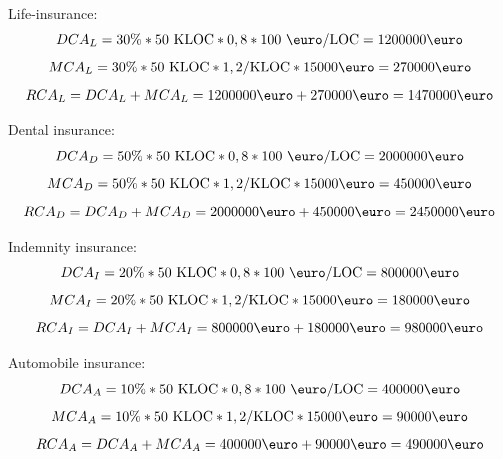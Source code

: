 \documentclass[a4paper,12pt,oneside]{scrreprt}
\begin{document}
Life-insurance:
\begin{equation*}
	DCA_L = 30\% * 50 \text{ KLOC} * 0,8 * 100\text{ \euro/LOC} = 1200000 \text{\euro}
\end{equation*}
\begin{equation*}
	MCA_L = 30\% * 50 \text{ KLOC} * 1,2/\text{KLOC} * 15000\text{\euro} = 270000\text{\euro}
\end{equation*}
\begin{equation*}
	RCA_L = DCA_L + MCA_L = 1200000\text{\euro} + 270000\text{\euro} = 1470000\text{\euro}
\end{equation*}

Dental insurance:
\begin{equation*}
	DCA_D = 50\% * 50 \text{ KLOC} * 0,8 * 100\text{ \euro/LOC} = 2000000 \text{\euro}
\end{equation*}
\begin{equation*}
	MCA_D = 50\% * 50 \text{ KLOC} * 1,2/\text{KLOC} * 15000\text{\euro} = 450000\text{\euro}
\end{equation*}
\begin{equation*}
	RCA_D = DCA_D + MCA_D = 2000000\text{\euro} + 450000\text{\euro} = 2450000\text{\euro}
\end{equation*}

Indemnity insurance:
\begin{equation*}
	DCA_I = 20\% * 50 \text{ KLOC} * 0,8 * 100\text{ \euro/LOC} = 800000 \text{\euro}
\end{equation*}
\begin{equation*}
	MCA_I = 20\% * 50 \text{ KLOC} * 1,2/\text{KLOC} * 15000\text{\euro} = 180000\text{\euro}
\end{equation*}
\begin{equation*}
	RCA_I = DCA_I + MCA_I = 800000\text{\euro} + 180000\text{\euro} = 980000\text{\euro}
\end{equation*}

Automobile insurance:
\begin{equation*}
	DCA_A = 10\% * 50 \text{ KLOC} * 0,8 * 100\text{ \euro/LOC} = 400000 \text{\euro}
\end{equation*}
\begin{equation*}
	MCA_A = 10\% * 50 \text{ KLOC} * 1,2/\text{KLOC} * 15000\text{\euro} = 90000\text{\euro}
\end{equation*}
\begin{equation*}
	RCA_A = DCA_A + MCA_A = 400000\text{\euro} + 90000\text{\euro} = 490000\text{\euro}
\end{equation*}
\end{document}
